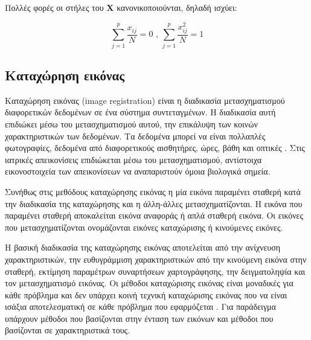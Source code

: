 \documentclass[a4paper,12pt]{article}
\begin{document}
Πολλές φορές οι στήλες του $\bm{X}$ κανονικοποιούνται, δηλαδή ισχύει:

\begin{equation*}
    \sum_{j=1}^{p} {\frac{x_{ij}}{N}} = 0
    \text{ , }
    \sum_{j=1}^{p} {\frac{x_{ij}^2}{N}} = 1
\end{equation*}

\subsection{Καταχώρηση εικόνας}

Καταχώρηση εικόνας (image registration) είναι η διαδικασία μετασχηματισμού
διαφορετικών δεδομένων σε ένα σύστημα συντεταγμένων. Η διαδικασία αυτή επιδιώκει
μέσω του μετασχηματισμού αυτού, την επικάλυψη των κοινών χαρακτηριστικών των
δεδομένων. Τα δεδομένα μπορεί να είναι πολλαπλές φωτογραφίες, δεδομένα από
διαφορετικούς αισθητήρες, ώρες, βάθη και οπτικές \cite{Registration:1}. Στις
ιατρικές απεικονίσεις επιδιώκεται μέσω του μετασχηματισμού, αντίστοιχα
εικονοστοιχεία των απεικονίσεων να αναπαριστούν όμοια βιολογικά σημεία.

Συνήθως στις μεθόδους καταχώρησης εικόνας η μία εικόνα παραμένει σταθερή κατά
την διαδικασία της καταχώρησης και η άλλη-άλλες μετασχηματίζονται. Η εικόνα που
παραμένει σταθερή αποκαλείται εικόνα αναφοράς ή απλά σταθερή εικόνα. Οι εικόνες
που μετασχηματίζονται ονομάζονται εικόνες καταχώρισης ή κινούμενες εικόνες.


Η βασική διαδικασία της καταχώρησης εικόνας αποτελείται από την ανίχνευση
χαρακτηριστικών, την ευθυγράμμιση χαρακτηριστικών από την κινούμενη εικόνα στην
σταθερή, εκτίμηση παραμέτρων συναρτήσεων χαρτογράφησης, την δειγματοληψία και
τον μετασχηματισμό εικόνας. Οι μέθοδοι καταχώρισης εικόνας είναι μοναδικές για
κάθε πρόβλημα και δεν υπάρχει κοινή τεχνική καταχώρισης εικόνας που να είναι
ισάξια αποτελεσματική σε κάθε πρόβλημα που εφαρμόζεται \cite{Registration:2}.
Για παράδειγμα υπάρχουν μέθοδοι που βασίζονται στην ένταση των εικόνων και
μέθοδοι που βασίζονται σε χαρακτηριστικά τους.

\end{document}
